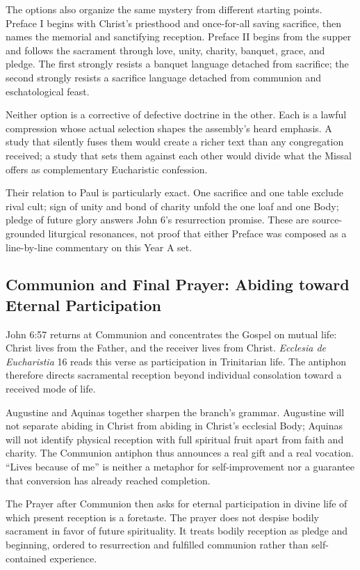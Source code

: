 \begin{deepstudy}
The options also organize the same mystery from different starting points. Preface I begins with Christ's priesthood and once-for-all saving sacrifice, then names the memorial and sanctifying reception. Preface II begins from the supper and follows the sacrament through love, unity, charity, banquet, grace, and pledge. The first strongly resists a banquet language detached from sacrifice; the second strongly resists a sacrifice language detached from communion and eschatological feast.

Neither option is a corrective of defective doctrine in the other. Each is a lawful compression whose actual selection shapes the assembly's heard emphasis. A study that silently fuses them would create a richer text than any congregation received; a study that sets them against each other would divide what the Missal offers as complementary Eucharistic confession.

Their relation to Paul is particularly exact. One sacrifice and one table exclude rival cult; sign of unity and bond of charity unfold the one loaf and one Body; pledge of future glory answers John 6's resurrection promise. These are source-grounded liturgical resonances, not proof that either Preface was composed as a line-by-line commentary on this Year A set.

\subsection*{Communion and Final Prayer: Abiding toward Eternal Participation\enspace{}}

John 6:57 returns at Communion and concentrates the Gospel on mutual life: Christ lives from the Father, and the receiver lives from Christ. \emph{Ecclesia de Eucharistia} 16 reads this verse as participation in Trinitarian life. The antiphon therefore directs sacramental reception beyond individual consolation toward a received mode of life.

Augustine and Aquinas together sharpen the branch's grammar. Augustine will not separate abiding in Christ from abiding in Christ's ecclesial Body; Aquinas will not identify physical reception with full spiritual fruit apart from faith and charity. The Communion antiphon thus announces a real gift and a real vocation. “Lives because of me” is neither a metaphor for self-improvement nor a guarantee that conversion has already reached completion.

The Prayer after Communion then asks for eternal participation in divine life of which present reception is a foretaste. The prayer does not despise bodily sacrament in favor of future spirituality. It treats bodily reception as pledge and beginning, ordered to resurrection and fulfilled communion rather than self-contained experience.


\end{deepstudy}
